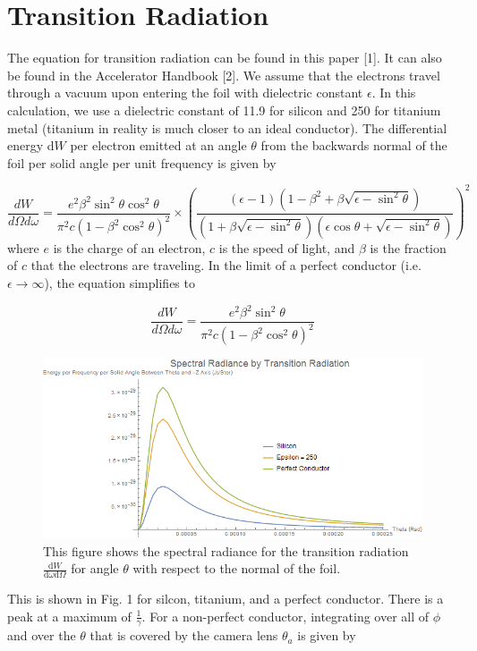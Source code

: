 \documentclass[12pt]{article}
\begin{document}
\section{Transition Radiation}

The equation for transition radiation can be found in this paper [1]. It can also be found in the Accelerator Handbook [2]. We assume that the electrons travel through a vacuum upon entering the foil with dielectric constant $\epsilon$. In this calculation, we use a dielectric constant of 11.9 for silicon and 250 for titanium metal (titanium in reality is much closer to an ideal conductor). The differential energy d$W$ per electron emitted at an angle $\theta$ from the backwards normal of the foil per solid angle per unit frequency is given by

\begin{equation}
\frac{dW} {d \Omega d \omega} =\frac{e^{2} \beta^{2} \sin^2 \theta \cos^2 \theta} {\pi^{2} c (1-\beta^{2} \cos^2 \theta)^{2}} \times \left( \frac{(\epsilon -1) (1-\beta^{2}+\beta \sqrt{\epsilon-\sin^2 \theta})} {(1+\beta \sqrt{\epsilon-\sin^2 \theta}) (\epsilon \cos \theta + \sqrt{\epsilon- \sin^2 \theta})} \right)^{2}
\end{equation}
where $e$ is the charge of an electron, $c$ is the speed of light, and $\beta$ is the fraction of $c$ that the electrons are traveling. In the limit of a perfect conductor (i.e. $\epsilon \rightarrow \infty$), the equation simplifies to

\begin{equation}
\frac{dW} {d \Omega d \omega} =\frac{e^{2} \beta^{2} \sin^2 \theta} {\pi^{2} c (1-\beta^{2} \cos^2 \theta)^{2}}
\end{equation}

\begin{figure}
\begin{center}
\includegraphics[scale=0.5]{dWdomega.PNG}
\caption{This figure shows the spectral radiance for the transition radiation $\frac{\mathrm{d}W}{\mathrm{d} \omega \mathrm{d} \Omega}$ for angle $\theta$ with respect to the normal of the foil.}
\end{center}
\end{figure}
This is shown in Fig. 1 for silcon, titanium, and a perfect conductor. There is a peak at a maximum of $\frac{1}{\gamma}$. For a non-perfect conductor, integrating over all of $\phi$ and over the $\theta$ that is covered by the camera lens $\theta_a$ is given by
\end{document}
